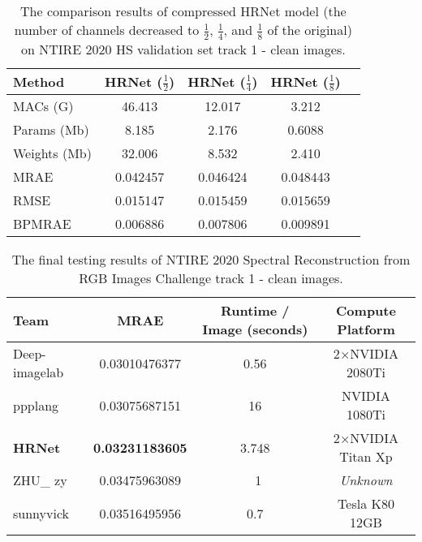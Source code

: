 \documentclass[10pt,twocolumn,letterpaper]{article}
\begin{document}
\begin{table}[t]
\begin{center}
\begin{tabular}{lcccc}
\hline
Method & HRNet ($\frac{1}{2}$) & HRNet ($\frac{1}{4}$) & HRNet ($\frac{1}{8}$) \\
\hline
\hline
MACs (G) & 46.413 & 12.017 & 3.212 \\
Params (Mb) & 8.185 & 2.176 & 0.6088 \\
Weights (Mb) & 32.006 & 8.532 & 2.410 \\
MRAE & 0.042457 & 0.046424 & 0.048443 \\
RMSE & 0.015147 & 0.015459 & 0.015659 \\
BPMRAE & 0.006886 & 0.007806 & 0.009891 \\
\hline
\end{tabular}
\end{center}
\caption{The comparison results of compressed HRNet model (the number of channels decreased to $\frac{1}{2}$, $\frac{1}{4}$, and $\frac{1}{8}$ of the original) on NTIRE 2020 HS validation set track 1 - clean images.}
\label{para}
\end{table}

\begin{table*}[t]
\begin{center}
\begin{tabular}{lccc}
\hline
Team & MRAE & Runtime / Image (seconds) & Compute Platform \\
\hline
\hline
Deep-imagelab & 0.03010476377 & 0.56 & 2$\times$NVIDIA 2080Ti \\
\hline
ppplang & 0.03075687151 & 16 & NVIDIA 1080Ti \\
\hline
\textbf{HRNet} & \textbf{0.03231183605} & 3.748 & 2$\times$NVIDIA Titan Xp \\
\hline
ZHU\_ zy & 0.03475963089 & ~1 & \emph{Unknown} \\
\hline
sunnyvick & 0.03516495956 & 0.7 & Tesla K80 12GB \\
\hline
\end{tabular}
\end{center}
\caption{The final testing results of NTIRE 2020 Spectral Reconstruction from RGB Images Challenge track 1 - clean images.}
\label{track1}
\end{table*}
\end{document}
